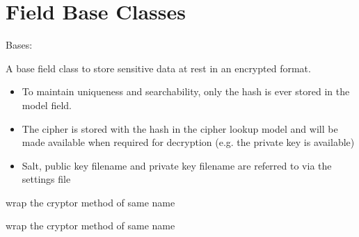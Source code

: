 \documentclass[letterpaper,10pt,english]{sphinxmanual}
\begin{document}
\section{Field Base Classes}
\label{field_classes:field-base-classes}

\begin{fulllineitems}
\label{field_classes:bhp_crypto.classes.BaseEncryptedField}
Bases: 

A base field class to store sensitive data at rest in an encrypted
format.
\begin{itemize}
\item {} 
To maintain uniqueness and searchability, only the hash is ever
stored in the model field.

\item {} 
The cipher is stored with the hash in the  cipher lookup model and will be
made available when required for decryption (e.g. the private key is
available)

\item {} 
Salt, public key filename and private key filename are referred to
via the settings file

\end{itemize}

\begin{fulllineitems}
\label{field_classes:bhp_crypto.classes.BaseEncryptedField.decrypt}
wrap the cryptor method of same name

\end{fulllineitems}


\begin{fulllineitems}
\label{field_classes:bhp_crypto.classes.BaseEncryptedField.encrypt}
wrap the cryptor method of same name

\end{fulllineitems}



\end{fulllineitems}
\end{document}
